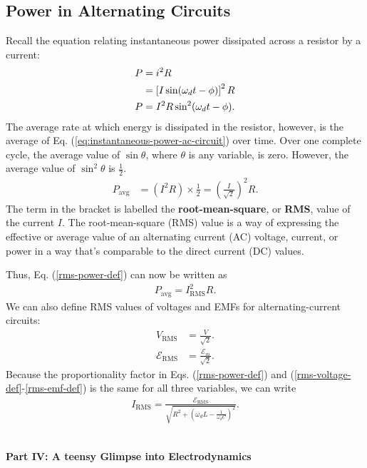 \documentclass[12pt,b4paper]{article}
\begin{document}
\subsection{Power in Alternating Circuits}
Recall the equation relating instantaneous power dissipated across a resistor by a current:
\begin{align}
    P&=i^2R\notag\\
    &=\left[I\sin(\omega_dt-\phi)\right]^2R\notag\\
    P&=I^2R\sin^2(\omega_dt-\phi).\label{eq:instantaneous-power-ac-circuit}
\end{align}
The average rate at which energy is dissipated in the resistor, however, is the average of Eq. (\ref{eq:instantaneous-power-ac-circuit}) over time. Over one complete cycle, the average value of $\sin\theta$, where $\theta$ is any variable, is zero. However, the average value of $\sin^2\theta$ is $\displaystyle\frac{1}{2}$.
\begin{align}
    P_\text{avg}&=(I^2R)\times\frac{1}{2}=\left(\frac{I}{\sqrt{2}}\right)^2R.\label{rms-power-def}
\end{align}
The term in the bracket is labelled the \textbf{root-mean-square}, or \textbf{RMS}, value of the current $I$. The root-mean-square (RMS) value is a way of expressing the effective or average value of an alternating current (AC) voltage, current, or power in a way that's comparable to the direct current (DC) values.

Thus, Eq. (\ref{rms-power-def}) can now be written as
\begin{align}
    P_\text{avg}=I_\text{RMS}^2R.
\end{align}
We can also define RMS values of voltages and EMFs for alternating-current
circuits:
\begin{align}
    V_\text{RMS}&=\frac{V}{\sqrt{2}}.\label{rms-voltage-def}\\
    \mathcal{E}_\text{RMS}&=\frac{\mathcal{E}_m}{\sqrt{2}}.\label{rms-emf-def}
\end{align}
Because the proportionality factor in Eqs. (\ref{rms-power-def}) and (\ref{rms-voltage-def}-\ref{rms-emf-def}) is the same
for all three variables, we can write
\begin{align}
    I_\text{RMS}=\frac{\mathcal{E}_\text{RMS}}{\displaystyle\sqrt{R^2+\left(\omega_dL-\frac{1}{\omega_dC}\right)^2}}.
\end{align}
\clearpage
\bigskip \
\vspace{10cm}
\vskip 20pt
\begin{center}
    \thispagestyle{empty}
    \huge{\selectfont \bf \sffamily Part IV: A \small{teensy} \huge{Glimpse into Electrodynamics}}
\end{center}
\vfill
\clearpage
\end{document}
